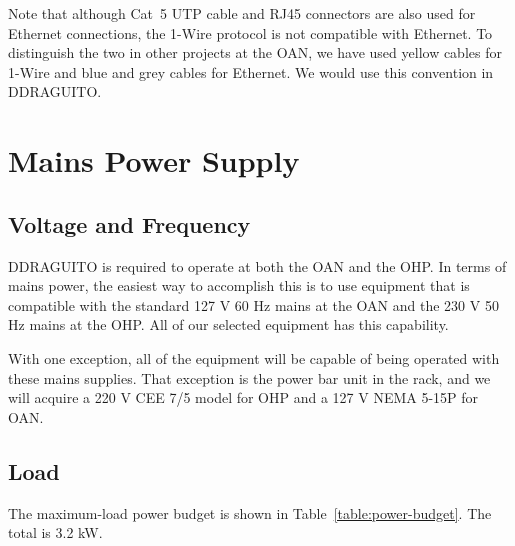 \documentclass{article}
\begin{document}
Note that although Cat~5 UTP cable and RJ45 connectors are also used for Ethernet connections, the 1-Wire protocol is not compatible with Ethernet. To distinguish the two in other projects at the OAN, we have used yellow cables for 1-Wire and blue and grey cables for Ethernet. We would use this convention in DDRAGUITO.



\clearpage
\section{Mains Power Supply}

\subsection{Voltage and Frequency}

DDRAGUITO is required to operate at both the OAN and the OHP. In terms of mains power, the easiest way to accomplish this is to use equipment that is compatible with the standard 127 V 60 Hz mains at the OAN and the 230 V 50 Hz mains at the OHP. All of our selected equipment has this capability.

With one exception, all of the equipment will be capable of being operated with these mains supplies. That exception is the power bar unit in the rack, and we will acquire a 220 V CEE 7/5 model for OHP and a 127 V NEMA 5-15P for OAN.


\subsection{Load}

The maximum-load power budget is shown in Table~\ref{table:power-budget}. The total is 3.2 kW.
\end{document}
